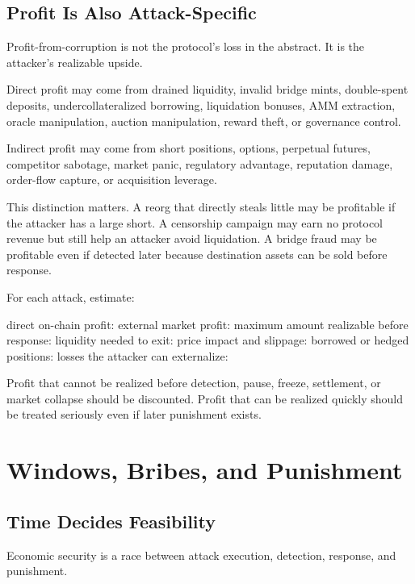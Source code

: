 \subsection{Profit Is Also Attack-Specific}

Profit-from-corruption is not the protocol's loss in the abstract. It is the attacker's realizable upside.

Direct profit may come from drained liquidity, invalid bridge mints, double-spent deposits, undercollateralized borrowing, liquidation bonuses, AMM extraction, oracle manipulation, auction manipulation, reward theft, or governance control.

Indirect profit may come from short positions, options, perpetual futures, competitor sabotage, market panic, regulatory advantage, reputation damage, order-flow capture, or acquisition leverage.

This distinction matters. A reorg that directly steals little may be profitable if the attacker has a large short. A censorship campaign may earn no protocol revenue but still help an attacker avoid liquidation. A bridge fraud may be profitable even if detected later because destination assets can be sold before response.

For each attack, estimate:

\begin{codeblock}
direct on-chain profit:
external market profit:
maximum amount realizable before response:
liquidity needed to exit:
price impact and slippage:
borrowed or hedged positions:
losses the attacker can externalize:
\end{codeblock}

Profit that cannot be realized before detection, pause, freeze, settlement, or market collapse should be discounted. Profit that can be realized quickly should be treated seriously even if later punishment exists.

\section{Windows, Bribes, and Punishment}

\subsection{Time Decides Feasibility}

Economic security is a race between attack execution, detection, response, and punishment.

